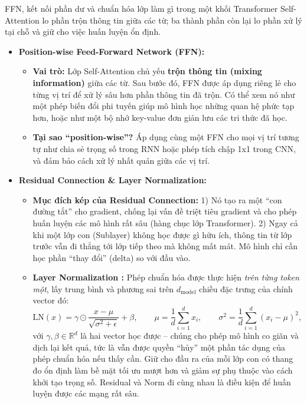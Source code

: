 \begin{deepdive}{FFN, kết nối phần dư và chuẩn hóa lớp làm gì trong một khối Transformer}
Self-Attention lo phần trộn thông tin giữa các từ; ba thành phần còn lại lo phần xử lý tại chỗ và giữ cho việc huấn luyện ổn định.
\begin{itemize}
    \item \textbf{Position-wise Feed-Forward Network (FFN):}
        \begin{itemize}
            \item \textbf{Vai trò:} Lớp Self-Attention chủ yếu \textbf{trộn thông tin (mixing information)} giữa các từ. Sau bước đó, FFN được áp dụng riêng lẻ cho từng vị trí để xử lý sâu hơn phần thông tin đã trộn. Có thể xem nó như một phép biến đổi phi tuyến giúp mô hình học những quan hệ phức tạp hơn, hoặc như một bộ nhớ key-value đơn giản lưu các tri thức đã học.
            \item \textbf{Tại sao “position-wise”?} Áp dụng cùng một FFN cho mọi vị trí tương tự như chia sẻ trọng số trong RNN hoặc phép tích chập 1x1 trong CNN, và đảm bảo cách xử lý nhất quán giữa các vị trí.
        \end{itemize}
    \item \textbf{Residual Connection \& Layer Normalization:}
        \begin{itemize}
            \item \textbf{Mục đích kép của Residual Connection:} 1) Nó tạo ra một “con đường tắt” cho gradient, chống lại vấn đề triệt tiêu gradient và cho phép huấn luyện các mô hình rất sâu (hàng chục lớp Transformer). 2) Ngay cả khi một lớp con (Sublayer) không học được gì hữu ích, thông tin từ lớp trước vẫn đi thẳng tới lớp tiếp theo mà không mất mát. Mô hình chỉ cần học phần “thay đổi” (delta) so với đầu vào.
            \item \textbf{Layer Normalization \cite{ba2016layer}:} Phép chuẩn hóa được thực hiện \emph{trên từng token một}, lấy trung bình và phương sai trên $d_{\text{model}}$ chiều đặc trưng của chính vector đó:
            \[
            \text{LN}(x) = \gamma \odot \frac{x - \mu}{\sqrt{\sigma^2 + \epsilon}} + \beta,
            \qquad \mu = \frac{1}{d}\sum_{i=1}^{d} x_i, \qquad \sigma^2 = \frac{1}{d}\sum_{i=1}^{d}(x_i - \mu)^2 ,
            \]
            với $\gamma, \beta \in \mathbb{R}^{d}$ là hai vector học được -- chúng cho phép mô hình co giãn và dịch lại kết quả, tức là vẫn được quyền “hủy” một phần tác dụng của phép chuẩn hóa nếu thấy cần. Giữ cho đầu ra của mỗi lớp con có thang đo ổn định làm bề mặt tối ưu mượt hơn và giảm sự phụ thuộc vào cách khởi tạo trọng số. Residual và Norm đi cùng nhau là điều kiện để huấn luyện được các mạng rất sâu.

\end{itemize}
\end{itemize}
\end{deepdive}
